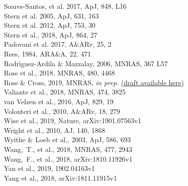 \documentclass[12pt]{article}
\begin{document}
Soares-Santos, et al. 2017, ApJ, 848, L16	\\
Stern et al. 2005, ApJ, 631, 163 \\
Stern et al. 2012,  ApJ, 753, 30 \\  %
Stern et al., 2018, ApJ, 864, 27 \\
Padovani et al. 2017, A\&ARv, 25, 2 \\
Rees, 1984, ARA\&A, 22, 471 \\
Rodr{\'{\i}}guez-Ardila \& Mazzalay, 2006, MNRAS, 367 L57 \\
Ross et al., 2018, MNRAS, 480, 4468 \\
Ross \& Cross, 2019, MNRAS, {\it in prep.} \href{https://github.com/d80b2t/VHzQ}{(draft available here)} \\
Valiante et al., 2018, MNRAS,  474, 3825 \\
van Velzen et al., 2016, ApJ, 829, 19 \\
Volonteri  et al., 2010, A\&ARv, 18, 279 \\
Wise et al., 2019, Nature,  arXiv:1901.07563v1 \\
Wright et al., 2010, AJ, 140, 1868 \\
Wyithe \& Loeb et al., 2003, ApJ, 586, 693 \\
Wang,~T., et al., 2018, MNRAS, 477, 2943 \\
Wang,~F., et al., 2018,  arXiv:1810.11926v1 \\
Yan et al., 2019, 1902.04163v1 \\
Yang et al,, 2018, arXiv:1811.11915v1 \\

\end{document}
